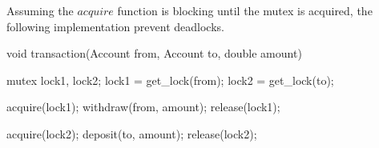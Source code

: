 \documentclass[a4paper,11pt]{report}
\begin{document}
Assuming the $acquire$ function is blocking until the mutex is acquired, the
following implementation prevent deadlocks.

\begin{ccode}
void transaction(Account from, Account to, double amount)
{
    mutex lock1, lock2;
    lock1 = get_lock(from);
    lock2 = get_lock(to);

    acquire(lock1);
    withdraw(from, amount);
    release(lock1);

    acquire(lock2);
    deposit(to, amount);
    release(lock2);
}
\end{ccode}
\end{document}
